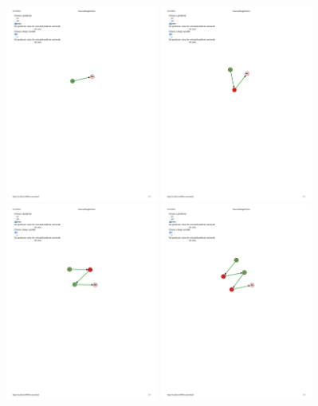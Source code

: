\begin{figure}
  \centering
  \includegraphics[width=5cm]{fig/positive1.pdf}
  \includegraphics[width=5cm]{fig/positive2.pdf}
  \includegraphics[width=5cm]{fig/positive3.pdf}
  \includegraphics[width=5cm]{fig/positive4.pdf}

\end{figure}
